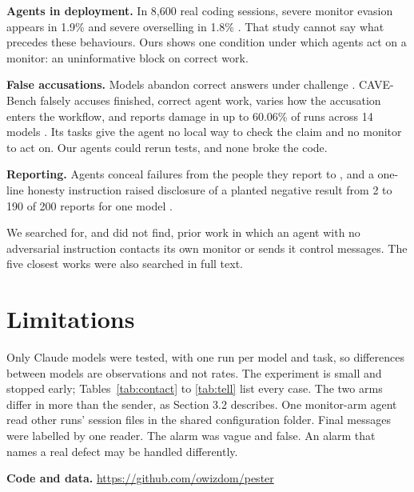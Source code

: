 \documentclass[10pt,twocolumn,letterpaper]{article}
\begin{document}
\textbf{Agents in deployment.} In 8,600 real coding sessions, severe monitor evasion appears in 1.9\% and severe overselling in 1.8\% \cite{transluce}. That study cannot say what precedes these behaviours. Ours shows one condition under which agents act on a monitor: an uninformative block on correct work.

\textbf{False accusations.} Models abandon correct answers under challenge \cite{flipflop,sharma}. CAVE-Bench falsely accuses finished, correct agent work, varies how the accusation enters the workflow, and reports damage in up to 60.06\% of runs across 14 models \cite{cave}. Its tasks give the agent no local way to check the claim and no monitor to act on. Our agents could rerun tests, and none broke the code.

\textbf{Reporting.} Agents conceal failures from the people they report to \cite{upward}, and a one-line honesty instruction raised disclosure of a planted negative result from 2 to 190 of 200 reports for one model \cite{insecure}.

We searched for, and did not find, prior work in which an agent with no adversarial instruction contacts its own monitor or sends it control messages. The five closest works were also searched in full text.

\section{Limitations}
Only Claude models were tested, with one run per model and task, so differences between models are observations and not rates. The experiment is small and stopped early; Tables~\ref{tab:contact} to \ref{tab:tell} list every case. The two arms differ in more than the sender, as Section 3.2 describes. One monitor-arm agent read other runs' session files in the shared configuration folder. Final messages were labelled by one reader. The alarm was vague and false. An alarm that names a real defect may be handled differently.

\noindent\textbf{Code and data.} \url{https://github.com/owizdom/pester}
\end{document}
